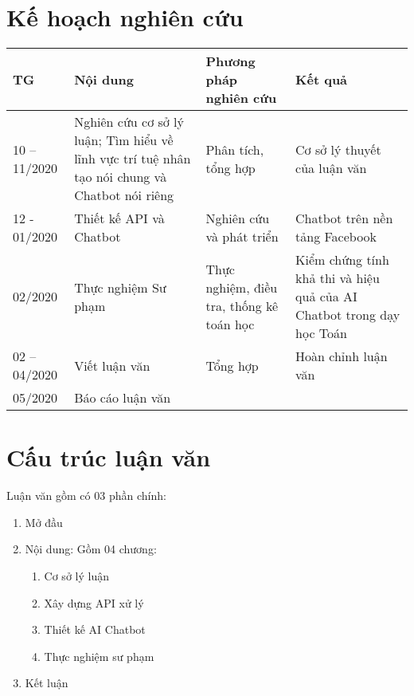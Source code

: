 \section{Kế hoạch nghiên cứu}
\begin{tabular}{|p{.1\linewidth}|p{.35\linewidth}|p{.2\linewidth}|p{.25\linewidth}|}
	\hline
	\textbf{TG} & \textbf{Nội dung} & \textbf{Phương pháp nghiên cứu} & \textbf{Kết quả} \\
	\hline
	10 – 11/2020 & Nghiên cứu cơ sở lý luận; Tìm hiểu về lĩnh vực trí tuệ nhân tạo nói chung và Chatbot nói riêng & Phân tích, tổng hợp & Cơ sở lý thuyết của luận văn \\
	\hline
	12 - 01/2020 & Thiết kế API và Chatbot & Nghiên cứu và phát triển & Chatbot trên nền tảng Facebook \\
	\hline
	02/2020 & Thực nghiệm Sư phạm & Thực nghiệm, điều tra, thống kê toán học & Kiểm chứng tính khả thi và hiệu quả của AI Chatbot trong dạy học Toán \\
	\hline
	02 – 04/2020 & Viết luận văn & Tổng hợp & Hoàn chỉnh luận văn \\
	\hline
	05/2020 & Báo cáo luận văn & & \\
	\hline
\end{tabular}
\section{Cấu trúc luận văn}
Luận văn gồm có 03 phần chính:
\begin{enumerate}[label=\textbf{Phần \arabic*.},align=left,left=0cm]
	\item Mở đầu
	\item Nội dung: Gồm 04 chương:\par
		\begin{enumerate}[label=Chương \arabic*.,align=left]
			\item Cơ sở lý luận
			\item Xây dựng API xử lý
			\item Thiết kế AI Chatbot
			\item Thực nghiệm sư phạm
		\end{enumerate}
	\item Kết luận
\end{enumerate}

\renewcommand*{\thesection}{\arabic{chapter}.\arabic{section}}
\renewcommand*{\thesubsection}{\arabic{chapter}.\arabic{section}.\arabic{subsection}}
